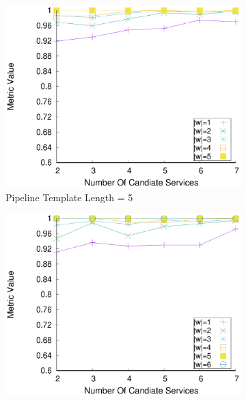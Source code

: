 \begin{figure}[ht!]
\begin{subfigure}{0.49\textwidth}
        \label{fig:quality_window_wide_qualitative_n4}
      \end{subfigure}
      \hfill
      \begin{subfigure}{0.49\textwidth}
        \includegraphics[width=\textwidth]{Images/graphs/window_quality_performance_diff_qual_n7_s7_20_100_n5}
        \caption{Pipeline Template Length = 5}
        \label{fig:quality_window_wide_qualitative_n5}
      \end{subfigure}
      \hfill
      \begin{subfigure}{0.49\textwidth}
        \includegraphics[width=\textwidth]{Images/graphs/window_quality_performance_diff_qual_n7_s7_20_100_n6}

\end{subfigure}
\end{figure}
